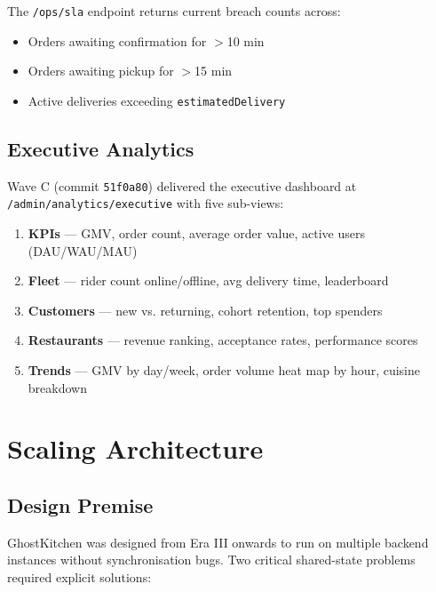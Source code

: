 \documentclass[11pt,a4paper,twoside]{book}
\begin{document}
The \texttt{/ops/sla} endpoint returns current breach counts across:

\begin{itemize}[leftmargin=1.4em,nosep]
  \item Orders awaiting confirmation for $>$10 min
  \item Orders awaiting pickup for $>$15 min
  \item Active deliveries exceeding \texttt{estimatedDelivery}
\end{itemize}

\section{Executive Analytics}

Wave C (commit \texttt{51f0a80}) delivered the executive dashboard at
\texttt{/admin/analytics/executive} with five sub-views:

\begin{enumerate}[leftmargin=1.5em]
  \item \textbf{KPIs} — GMV, order count, average order value, active users (DAU/WAU/MAU)
  \item \textbf{Fleet} — rider count online/offline, avg delivery time, leaderboard
  \item \textbf{Customers} — new vs. returning, cohort retention, top spenders
  \item \textbf{Restaurants} — revenue ranking, acceptance rates, performance scores
  \item \textbf{Trends} — GMV by day/week, order volume heat map by hour, cuisine breakdown
\end{enumerate}

\chapter{Scaling Architecture}

\section{Design Premise}

GhostKitchen was designed from Era III onwards to run on multiple backend
instances without synchronisation bugs.  Two critical shared-state problems
required explicit solutions:
\end{document}

